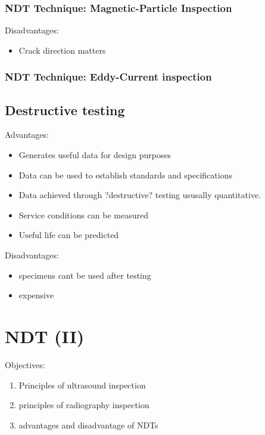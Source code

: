 \documentclass[11pt]{article}
\begin{document}
\subsubsection{NDT Technique: Magnetic-Particle Inspection}
Disadvantages:
\begin{itemize}
    \item Crack direction matters
\end{itemize}

\subsubsection{NDT Technique: Eddy-Current inspection}



\subsection{Destructive testing}
Advantages:
\begin{itemize}
    \item Generates useful data for design purposes
    \item Data can be used to establish standards and specifications
    \item Data achieved through ?destructive? testing ususally quantitative.
    \item Service conditions can be measured
    \item Useful life can be predicted
\end{itemize}
Disadvantages:
\begin{itemize}
    \item specimens cant be used after testing
    \item expensive
\end{itemize}
\subsection{}

\section{NDT (II)}
Objectives:
\begin{enumerate}
    \item Principles of ultrasound inspection
    \item principles of radiography inspection
    \item advantages and disadvantage of NDTs
\end{enumerate}
\end{document}
